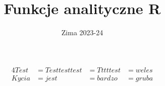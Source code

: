 \documentclass[a5paper, twoside]{article}
\title{Funkcje analityczne R}
\author{}
\date{Zima 2023-24}
\begin{document}

\begin{alignat*}{4}
  Test  & =Testtesttest & =Tttttest             &=weles\\ 
  Kycia &= jest         & =bardzo &= gruba
\end{alignat*}


\maketitle
\thispagestyle{empty} 
\newpage

\tableofcontents
\thispagestyle{empty}
\newpage

\pagestyle{fancy}


\end{document}
